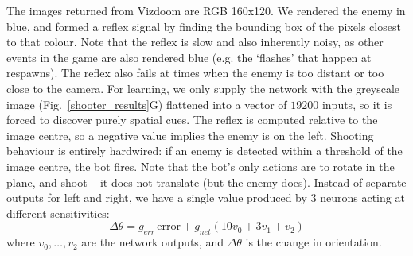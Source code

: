 \documentclass{aamas2018}
\begin{document}
The images returned from Vizdoom are RGB 160x120. We rendered the
enemy in blue, and formed a reflex signal by finding the bounding box
of the pixels closest to that colour. Note that the reflex is slow and
also inherently noisy, as other events in the game are also rendered
blue (e.g. the ‘flashes’ that happen at respawns). The reflex also
fails at times when the enemy is too distant or too close to the
camera. For learning, we only supply the network with the greyscale
image (Fig.~\ref{shooter_results}G) flattened into a vector of $19200$
inputs, so it is forced to discover purely spatial cues. The reflex is
computed relative to the image centre, so a negative value implies the
enemy is on the left. Shooting behaviour is entirely hardwired: if an
enemy is detected within a threshold of the image centre, the bot
fires. Note that the bot's only actions are to rotate in the plane,
and shoot -- it does not translate (but the enemy does). Instead of
separate outputs for left and right, we have a single value produced
by 3 neurons acting at different sensitivities:
\begin{equation}
\Delta \theta = g_{err}\, \mathrm{error} + g_{net} \left( 10 v_0 + 3 v_1 + v_2 \right)
\end{equation}
where $v_0, \ldots, v_2$ are the network outputs, and $\Delta \theta$
is the change in orientation.
\end{document}
